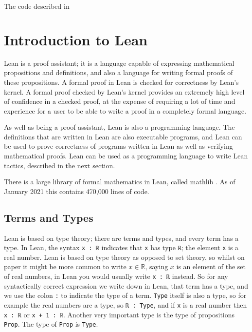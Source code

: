 \documentclass[12pt]{article} %
\theoremstyle{definition}
\theoremstyle{definition}
\theoremstyle{definition}
\theoremstyle{definition}
\begin{document}
The code described in

\section{Introduction to Lean}

Lean \cite{MR3446905} is a proof assistant;
it is a language capable of expressing mathematical propositions
and definitions, and also a language for writing formal proofs of these propositions.
A formal proof in Lean is checked for correctness by Lean's kernel.
A formal proof checked by Lean's kernel provides
an extremely high level of confidence in a checked proof, at the expense of requiring a lot
of time and experience for a user to be able to write a proof in a completely formal language.

As well as being a proof assistant, Lean is also a programming language. The definitions
that are written in Lean are also executable programs, and Lean can be used to prove correctness
of programs written in Lean as well as verifying mathematical proofs. Lean can
be used as a programming language to write Lean tactics, described in the next section.

There is a large library of formal mathematics in Lean, called mathlib
\cite{ThemathlibCommunity2020}. As of January 2021 this contains 470,000 lines of code.

\subsection{Terms and Types}

Lean is based on type theory; there are terms and types, and every term has a type.
In Lean, the syntax \lstinline{x : ℝ} indicates that \lstinline{x} has type \lstinline{ℝ};
the element \lstinline{x} is a real number.
Lean is based on type theory as opposed to set theory, so whilst on paper it might
be more common to write $x \in \mathbb{R}$, saying $x$ is an element of the set of real numbers, in Lean
you would usually write \lstinline{x : ℝ} instead.
So for any syntactically correct expression we write down in Lean, that term has a type,
and we use the colon \lstinline{:} to indicate the type of a term.
\lstinline{Type} itself is also a type, so for example the real numbers are a type,
so \lstinline{ℝ : Type},
and if \lstinline{x} is a real number then \lstinline{x : ℝ} or \lstinline{x + 1 : ℝ}.
Another very important type is the type of propositions \lstinline{Prop}.
The type of \lstinline{Prop} is \lstinline{Type}.
\end{document}
